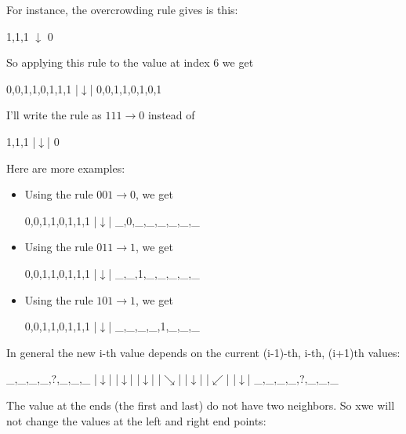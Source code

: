For instance, the overcrowding rule gives is this:

\begin{center}
1,1,1
$\downarrow$
0
\end{center}

So applying this rule to the value at index 6 we get

\begin{consolethree}[escapeinside=||]
0,0,1,1,0,1,1,1
            |$\downarrow$|
0,0,1,1,0,1,0,1
\end{consolethree}

I'll write the rule as $111 \rightarrow 0$ instead of

\begin{consolethree}[escapeinside=||]
1,1,1
  |$\downarrow$|
  0
\end{consolethree}

Here are more examples:

\begin{itemize}
\item
  Using the rule $001 \rightarrow 0$, we get

\begin{consolethree}[escapeinside=||]
0,0,1,1,0,1,1,1
  |$\downarrow$|
_,0,_,_,_,_,_,_
\end{consolethree}

\item
  Using the rule $011 \rightarrow 1$, we get

\begin{consolethree}[escapeinside=||]
0,0,1,1,0,1,1,1
    |$\downarrow$|
_,_,1,_,_,_,_,_
\end{consolethree}

\item
  Using the rule $101 \rightarrow 1$, we get

\begin{consolethree}[escapeinside=||]
0,0,1,1,0,1,1,1
        |$\downarrow$|
_,_,_,_,1,_,_,_
\end{consolethree}
\end{itemize}

In general the new i-th value depends on the current (i-1)-th, i-th, (i+1)th values:

\begin{consolethree}[escapeinside=||]
_,_,_,_,?,_,_,_
      |$\downarrow$|  |$\downarrow$|  |$\downarrow$|
      |$\searrow$| |$\downarrow$| |$\swarrow$|
                 |$\downarrow$|
_,_,_,_,?,_,_,_
\end{consolethree}
The value at the ends (the first and last) do not have two neighbors. So xwe will not change the values at the left and right end points:


